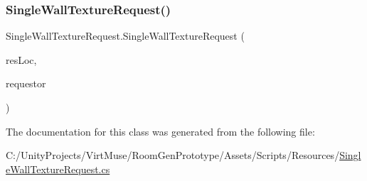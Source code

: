 \subsubsection{\texorpdfstring{Single\+Wall\+Texture\+Request()}{SingleWallTextureRequest()}}
{\footnotesize\ttfamily Single\+Wall\+Texture\+Request.\+Single\+Wall\+Texture\+Request (\begin{DoxyParamCaption}\item[{int}]{res\+Loc,  }\item[{Game\+Object}]{requestor }\end{DoxyParamCaption})}



The documentation for this class was generated from the following file\+:\begin{DoxyCompactItemize}
\item 
C\+:/\+Unity\+Projects/\+Virt\+Muse/\+Room\+Gen\+Prototype/\+Assets/\+Scripts/\+Resources/\mbox{\hyperlink{_single_wall_texture_request_8cs}{Single\+Wall\+Texture\+Request.\+cs}}\end{DoxyCompactItemize}
